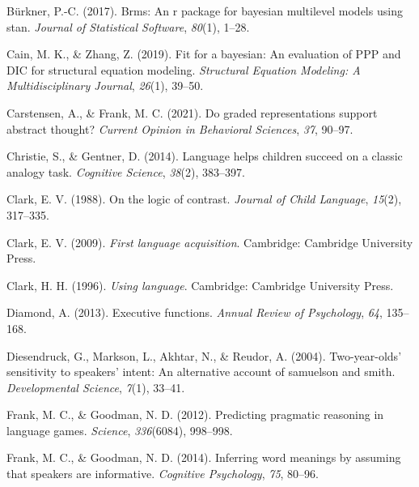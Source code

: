 \documentclass[
  english,
  man,floatsintext]{apa6}
\newlength{\cslhangindent}
\newlength{\cslentryspacingunit} %
\newenvironment{CSLReferences}[2] %
 {%
  \setlength{\parindent}{0pt}
  \ifodd #1
  \let\oldpar\par
  \def\par{\hangindent=\cslhangindent\oldpar}
  \fi
  \setlength{\parskip}{#2\cslentryspacingunit}
 }%
 {}
\begin{document}
\begin{CSLReferences}{1}{0}
\leavevmode{}%
Bürkner, P.-C. (2017). Brms: An r package for bayesian multilevel models using stan. \emph{Journal of Statistical Software}, \emph{80}(1), 1--28.

\leavevmode{}%
Cain, M. K., \& Zhang, Z. (2019). Fit for a bayesian: An evaluation of PPP and DIC for structural equation modeling. \emph{Structural Equation Modeling: A Multidisciplinary Journal}, \emph{26}(1), 39--50.

\leavevmode{}%
Carstensen, A., \& Frank, M. C. (2021). Do graded representations support abstract thought? \emph{Current Opinion in Behavioral Sciences}, \emph{37}, 90--97.

\leavevmode{}%
Christie, S., \& Gentner, D. (2014). Language helps children succeed on a classic analogy task. \emph{Cognitive Science}, \emph{38}(2), 383--397.

\leavevmode{}%
Clark, E. V. (1988). On the logic of contrast. \emph{Journal of Child Language}, \emph{15}(2), 317--335.

\leavevmode{}%
Clark, E. V. (2009). \emph{First language acquisition}. Cambridge: Cambridge University Press.

\leavevmode{}%
Clark, H. H. (1996). \emph{Using language}. Cambridge: Cambridge University Press.

\leavevmode{}%
Diamond, A. (2013). Executive functions. \emph{Annual Review of Psychology}, \emph{64}, 135--168.

\leavevmode{}%
Diesendruck, G., Markson, L., Akhtar, N., \& Reudor, A. (2004). Two-year-olds' sensitivity to speakers' intent: An alternative account of samuelson and smith. \emph{Developmental Science}, \emph{7}(1), 33--41.

\leavevmode{}%
Frank, M. C., \& Goodman, N. D. (2012). Predicting pragmatic reasoning in language games. \emph{Science}, \emph{336}(6084), 998--998.

\leavevmode{}%
Frank, M. C., \& Goodman, N. D. (2014). Inferring word meanings by assuming that speakers are informative. \emph{Cognitive Psychology}, \emph{75}, 80--96.


\end{CSLReferences}
\end{document}
